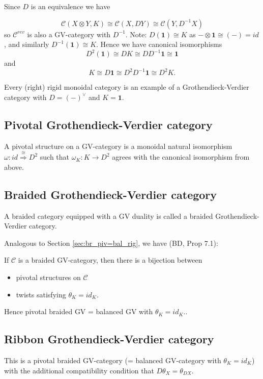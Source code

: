 \documentclass[11pt]{article}
\newcommand{\C}{\mathcal{C}}
\theoremstyle{definition}
\begin{document}
Since $D$ is an equivalence we have

$$\C(X\otimes Y, K) \cong \C(X,DY) \cong \C (Y, D^{-1}X)$$
so $\C^{rev}$ is also a GV-category with $D^{-1}$. Note: $D(\mathbf{1}) \cong K$ as $- \otimes \mathbf{1} \cong (-)= id$, and similarly $D^{-1}(\mathbf{1})\cong K$. Hence we have canonical isomorphisms 
$$D^2(\mathbf{1}) \cong DK \cong DD^{-1}\mathbf{1} \cong \mathbf{1} $$
and 
$$K \cong D \mathbf{1} \cong D^2 D^{-1} \mathbf{1} \cong D^2 K.$$


\medskip
{}
Every (right) rigid monoidal category is an example of a Grothendieck-Verdier category with $D=(-)^\vee$ and $K=\mathbf{1}$.


\subsection{Pivotal Grothendieck-Verdier category}


A pivotal structure on a GV-category is a monoidal natural isomorphism $\omega: id \overset{\cong}{\Longrightarrow} D^2$ such that $\omega_K : K \to D^2$  agrees with the canonical isomorphism from above.


\subsection{Braided Grothendieck-Verdier category}

A braided category equipped with a GV duality is called a braided Grothendieck-Verdier category.


Analogous to  Section \ref{sec:br_piv=bal_rig}, we have (BD, Prop 7.1):

If $\C $ is a braided GV-category, then there is a bijection between 
\begin{itemize}
    \item pivotal structures on $\C$
    \item twists satisfying $\theta_K = id_K.$
\end{itemize}

Hence pivotal braided GV = balanced GV with $\theta_K = id_K.$.


\subsection{Ribbon Grothendieck-Verdier category}


This is a pivotal braided GV-category (= balanced GV-category with $\theta_K = id_K$) with the additional compatibility condition that $D\theta_X = \theta_{DX}$.
\end{document}

